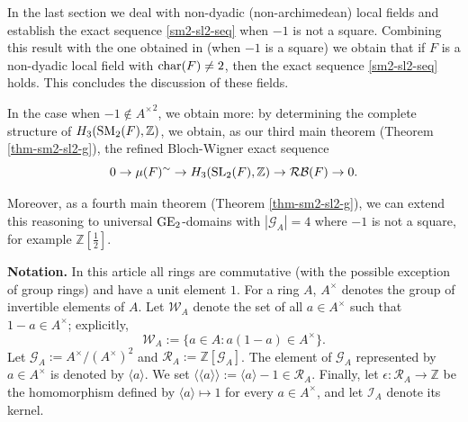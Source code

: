 \documentclass[11pt]{amsart}
\theoremstyle{definition}
\theoremstyle{plain}
\numberwithin{equation}{section}
\newcommand{\z}{\mathbb{Z}}
\newcommand{\F}{\mathbb{F}}
\newcommand{\GG}{\mathcal{G}}
\newcommand{\RR}{\mathcal{R}}
\newcommand{\WW}{\mathcal{W}}
\newcommand{\II}{\mathcal{I}}
\newcommand{\RP}{\mathcal{RP}}
\newcommand{\RB}{\mathcal{RB}}
\renewcommand{\aa}{{A^\times}}
\newcommand{\half}{{\left[\frac{1}{2}\right]}}
\newcommand{\mth}[1]{\left[ \frac{1}{#1} \right]}
\newcommand{\lan}{\langle}
\newcommand{\ran}{\rangle}
\newcommand{\Lan}{\langle \! \langle}
\newcommand{\Ran}{\rangle \! \rangle}
\newcommand{\GE}{{\rm GE}}
\newcommand{\SL}{\mathit{{\rm SL}}}
\newcommand{\SM}{\mathit{{\rm SM}}}
\renewcommand{\char}{{\rm char}}
\begin{document}


In the last section we deal with non-dyadic (non-archimedean) local fields and establish the exact sequence \eqref{sm2-sl2-seq} when $-1$ is not a square. Combining this result with the one obtained in \cite[Theorem 6.8]{B-E--2023} (when $-1$ is a square) we obtain that if
$F$ is a non-dyadic local field with $\char(F)\neq 2$, then the exact sequence \eqref{sm2-sl2-seq} holds. This concludes the discussion of these fields. 

In the case when $-1\notin\aa^2$, we obtain more: by determining the complete structure of $H_3(\SM_2(F),\z)$, we obtain, as our third main theorem (Theorem \ref{thm-sm2-sl2-g}), the refined Bloch-Wigner exact sequence
\[
    0\to\mu(F)^\sim\to H_3(\SL_2(F),\z)\to \RB(F)\to 0.
\]

Moreover, as a fourth main theorem (Theorem \ref{thm-sm2-sl2-g}), we can extend this reasoning to universal $\GE_2$-domains with $|\GG_A|= 4$ where $-1$ is not a square, for example $\z\half$.

{\bf Notation.} In this article all rings are commutative (with the possible exception of group rings) and have a unit element $1$. For a ring $A$, $\aa$ denotes the group of invertible elements of $A$. 
Let $\WW_A$ denote the set of all $a\in \aa$ such that $1-a\in \aa$; explicitly,
\[
    \WW_A:=\{a\in A: a(1-a)\in \aa\}.
\]
Let $\GG_A:=\aa/(\aa)^2$ and $\RR_A:=\z[\GG_A]$. The element of $\GG_A$ represented by 
$a \in \aa$ is denoted by $\lan a \ran$. We set $\Lan a\Ran:=\lan a\ran -1\in \RR_A$. Finally, let $\epsilon:\RR_A\to\z$ be the homomorphism defined by $\lan a\ran\mapsto1$ for every $a\in\aa$, and let $\II_A$ denote its kernel.\\
~\\
\end{document}
